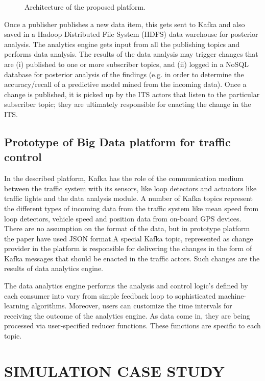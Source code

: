 \documentclass[sigconf]{acmart}
\begin{document}
\begin{figure}[h]
\centering
{}
\caption{Architecture of the proposed platform.}
\label{fig:1}
\end{figure}


Once a publisher publishes a new data item, this gets sent to Kafka and also saved in a Hadoop Distributed File System (HDFS) data warehouse for posterior analysis. The analytics engine gets input from all the publishing topics and performs data analysis. The results of the data analysis may trigger changes that are (i) published to one or more subscriber topics, and (ii) logged in a NoSQL database for posterior analysis of the findings (e.g. in order to determine the accuracy/recall of a predictive model mined from the incoming data). Once a change is published, it is picked up by the ITS actors that listen to the particular subscriber topic; they are ultimately responsible for enacting the change in the ITS.

\subsection{Prototype of Big Data platform for traffic control}

In the described platform, Kafka has the role of the communication medium between the traffic system with its sensors, like loop detectors and actuators like traffic lights and the data analysis module. A number of Kafka topics represent the different types of incoming data from the traffic system like mean speed from loop detectors, vehicle speed and position data from on-board GPS devices. There are no assumption on the format of the data, but in prototype platform the paper have used JSON format.A special Kafka topic, represented as change provider in the platform is responsible for delivering the changes in the form of Kafka messages that should be enacted in the traffic actors. Such changes are the results of data analytics engine.

The data analytics engine performs the analysis and control logic's defined by each consumer into vary from simple feedback loop to sophisticated machine-learning algorithms. Moreover, users can customize the time intervals for receiving the outcome of the analytics engine. As data come in, they are being processed via user-specified reducer functions. These functions are specific to each topic.

\section{SIMULATION CASE STUDY}
\end{document}
